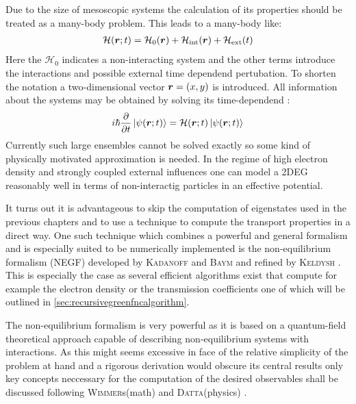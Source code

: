Due to the size of mesoscopic systems the calculation of its properties should be treated as a many-body problem. This leads to a many-body \hamil{} like:
\begin{align}
\mathcal{H}(\boldsymbol{r};t) = \mathcal{H}_0(\boldsymbol{r}) + \mathcal{H}_{\text{int}}(\boldsymbol{r})+\mathcal{H}_{\text{ext}}(t)
\end{align}
Here the $\mathcal{H}_0$ indicates a non-interacting system and the other terms introduce the interactions and possible external time dependend pertubation. To shorten the notation a two-dimensional vector $\boldsymbol{r}=(x,y)$ is introduced.  
All information about the systems may be obtained by solving its time-dependend \sdg{}:
\begin{align}
i\hbar \frac{\partial }{\partial t} \left| \psi(\boldsymbol{r};t) \right> = \mathcal{H}(\boldsymbol{r};t) \left| \psi(\boldsymbol{r};t) \right>
\label{eqn:timedependendsdg}
\end{align}
Currently such large ensembles cannot be solved exactly so some kind of physically motivated approximation is needed. In the regime of high electron density and strongly coupled external influences one can model a 2DEG reasonably well in terms of non-interactig particles in an effective potential\cite{fetter2003quantum}. \par
It turns out it is advantageous to skip the computation of eigenstates used in the previous chapters and to use a technique to compute the transport properties in a direct way. One such technique which combines a powerful and general formalism and is especially suited to be numerically implemented is the non-equilibrium \gfnc{} formalism (NEGF) developed by \textsc{Kadanoff} and \textsc{Baym} \cite{kadanoff1962quantum} and refined by \textsc{Keldysh} \cite{keldysh1965}. This is especially the case as several efficient algorithms exist that compute for example the electron density or the transmission coefficients one of which will be outlined in \cref{sec:recursivegreenfncalgorithm}.\par
The non-equilibrium \gfnc{} formalism is very powerful as it is based on a quantum-field theoretical approach capable of describing non-equilibrium systems with interactions. As this might seems excessive in face of the relative simplicity of the problem at hand and a rigorous derivation would obscure its central results only key concepts neccessary for the computation of the desired observables shall be discussed following \textsc{Wimmer}s(math) \cite{Wimmer2009Thesis} and \textsc{Datta}(physics) \cite{Datta1997}.\par
